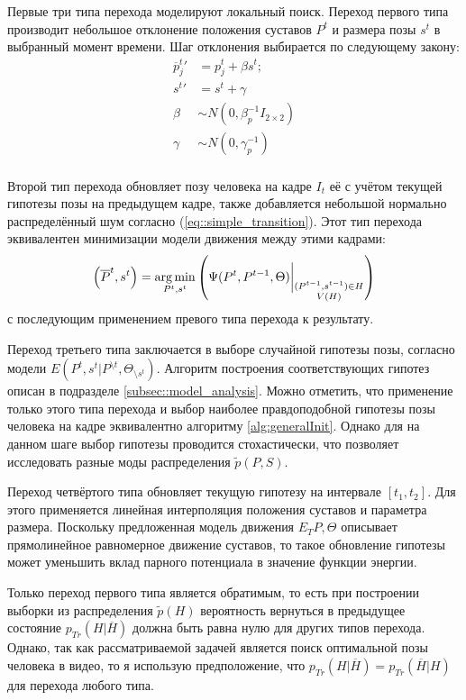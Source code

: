 Первые три типа перехода моделируют локальный поиск. Переход первого типа производит небольшое отклонение положения суставов $P^t$ и размера позы $s^t$ в выбранный момент времени. Шаг отклонения выбирается по следующему закону:
\begin{equation} \label{eq::simple_transition}
	\begin{aligned}
		{\overline{p}^t_j}' &= p^t_j + \beta s^t; \\
		{s^t}' &= s^t + \gamma \\
		\beta &\sim N(0, \beta_p^{-1} I_{2 \times 2}) \\
		\gamma &\sim N(0, \gamma_p^{-1}) \\
	\end{aligned}
\end{equation}

Второй тип перехода обновляет позу человека на кадре $I_t$ её с учётом текущей гипотезы позы на предыдущем кадре, также добавляется небольшой нормально распределённый шум согласно (\ref{eq::simple_transition}). Этот тип перехода эквивалентен минимизации модели движения между этими кадрами:
\begin{equation}
	\left(\overline{P}^t, s^t\right) = \operatorname*{arg\,min}_{P^t, s^t}\left(\Psi(P^t, P^{t-1}, \Theta)\bigg\rvert_{\substack{(P^{t-1}, s^{t-1}) \in H \\ V(H)}}\right)
\end{equation}
с последующим применением превого типа перехода к результату.

Переход третьего типа заключается в выборе случайной гипотезы позы, согласно модели $E(P^t, s^t | P^{\setminus t}, \Theta_{\setminus s^t})$. Алгоритм построения соответствующих гипотез описан в подразделе \ref{subsec::model_analysis}. Можно отметить, что применение только этого типа перехода и выбор наиболее правдоподобной гипотезы позы человека на кадре эквивалентно алгоритму \ref{alg:generalInit}. Однако для на данном шаге выбор гипотезы проводится стохастически, что позволяет исследовать разные моды распределения $\tilde{p}(P, S)$.

Переход четвёртого типа обновляет текущую гипотезу на интервале $\left[t_1, t_2\right]$. Для этого применяется линейная интерполяция положения суставов и параметра размера. Поскольку предложенная модель движения $E_T{P, \Theta}$ описывает прямолинейное равномерное движение суставов, то такое обновление гипотезы может уменьшить вклад парного потенциала в значение функции энергии.

Только переход первого типа является обратимым, то есть при построении выборки из распределения $\tilde{p}(H)$ вероятность вернуться в предыдущее состояние $p_{Tr}(H|\overline{H})$ должна быть равна нулю для других типов перехода. Однако, так как рассматриваемой задачей является поиск оптимальной позы человека в видео, то я использую предположение, что $p_{Tr}(H|\overline{H}) = p_{Tr}(\overline{H} | H)$ для перехода любого типа.

